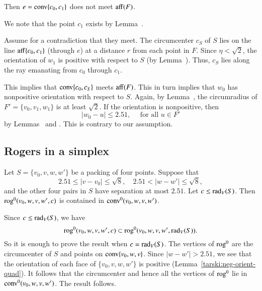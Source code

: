 \begin{tarskidata}
\begin{tarski}
\begin{lemma}
Then $e={\operatorname{conv}}\{c_0,c_1\}$ does not
meet ${\operatorname{aff}}(F)$.
\end{lemma}

\begin{proved}   We note that the point $c_1$ exists 
by Lemma~.

Assume for a contradiction that they meet.
The circumcenter $c_S$ of $S$ lies on
the line ${\operatorname{aff}}\{c_0,c_1\}$ (through $e$) at a
distance $r$ from each point in $F$.  
Since $\eta < \sqrt2$, the orientation of $w_1$ is positive
with respect to $S$ (by Lemma~). 
Thus, $c_S$ lies along
the ray emanating from $c_0$ through $c_1$.  

This implies that ${\operatorname{conv}}\{c_0,c_S\}$ meets ${\operatorname{aff}}(F)$.
This in turn implies that $w_0$ has nonpositive orientation with
respect to $S$.  Again, by Lemma~, the
circumradius of $F'=\{v_0,v_1,w_1\}$ is at least $\sqrt2$.
If the orientation is
nonpositive, then 
   $$|w_0-u|\le 2.51,\quad\text{ for all } u\in F'$$
by Lemmas~ and
. This is contrary to our assumption.
\swallowed\end{proved}
\end{tarski}






\begin{tarski}
\section{Rogers in a simplex}

\begin{lemma}
Let $S=\{v_0,v,w,w'\}$ be a packing of four points.
Suppose that
   $$
   2.51\le |v-v_0|\le\sqrt8,\quad 2.51< |w-w'|\le\sqrt8,
   $$
and the other four pairs in $S$ have separation at most $2.51$.
Let $c\le \operatorname{rad}_V(S)$.
Then ${\operatorname{rog}}^0(v_0,w,v,w',c)$ is contained in
${\operatorname{conv}}^0(v_0,w,v,w')$.
\end{lemma}

\begin{proved}  Since $c\le \operatorname{rad}_V(S)$, we have
  $$
  {\operatorname{rog}}^0(v_0,w,v,w',c)\subset {\operatorname{rog}}^0(v_0,w,v,w',\operatorname{rad}_V(S)).
  $$
So it is enough to prove the result when $c=\operatorname{rad}_V(S)$.
The vertices of ${\operatorname{rog}}^0$ are the circumcenter of $S$ and points
on ${\operatorname{conv}}\{v_0,w,v\}$.
Since $|w-w'|> 2.51$, we see that the orientation of each face
of $\{v_0,v,w,w'\}$ is positive (Lemma~\ref{tarski:neg-orient-quad}).   It follows that the circumcenter
and hence all
the vertices of ${\operatorname{rog}}^0$ lie in ${\operatorname{conv}}^0(v_0,w,v,w')$.
The result follows.
\swallowed\end{proved}
\end{tarski}






\end{tarskidata}
